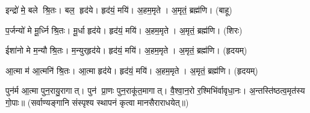    इन्द्रो॑ मे॒ बले श्रि॒तः।   बल॒ हृद॑ये।   हृद॑यं॒ मयि॑।   अ॒हम॒मृते।   अ॒मृतं॒ ब्रह्म॑णि। (बाहू)

   प॒र्जन्यो॑ मे मू॒र्ध्नि श्रि॒तः।   मू॒र्धा हृद॑ये।   हृद॑यं॒ मयि॑।   अ॒हम॒मृते।   अ॒मृतं॒ ब्रह्म॑णि। (शिरः)

   ईशा॑नो मे म॒न्यौ श्रि॒तः।   म॒न्युर्‌हृद॑ये।   हृद॑यं॒ मयि॑।    अ॒हम॒मृते।   अ॒मृतं॒ ब्रह्म॑णि। (हृदयम्)

   आ॒त्मा म॑ आ॒त्मनि॑ श्रि॒तः।   आ॒त्मा हृद॑ये।   हृद॑यं॒ मयि॑।   अ॒हम॒मृते।   अ॒मृतं॒ ब्रह्म॑णि।
(हृदयम्)

   पुन॑र्म आ॒त्मा पुन॒रायु॒रागात्।   पुन॑ प्रा॒णः पुन॒राकू॑त॒मागात्।   वै॒श्वा॒न॒रो र॒श्मिभि॑र्वावृधा॒नः।   अ॒न्तस्ति॑ष्ठत्व॒मृत॑स्य गो॒पाः॥ (सर्वाण्यङ्गानि संस्पृश्य स्थापनं कृत्वा मानसैराराधयेत्॥)
{\small \closesection}



{\small \closesection}




{\small \closesection}


